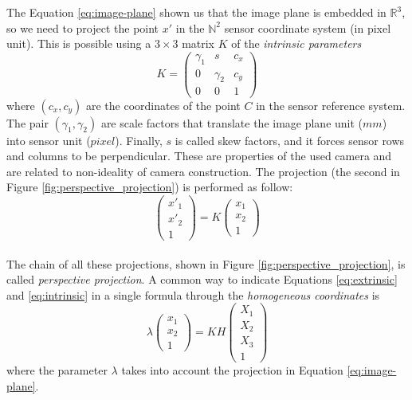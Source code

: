 The Equation \ref{eq:image-plane} shown us that the image plane is embedded in $\mathds{R}^3$, so we need to project the point $x'$ in the $\mathds{N}^2$ sensor coordinate system (in pixel unit). This is possible using a $3 \times 3$ matrix $K$ of the \textit{intrinsic parameters}
  \begin{equation*}
    \label{eq:intrinsic_matrix}
    K =
    \begin{pmatrix}
      \gamma_1	& s			& c_x \\
      0			& \gamma_2	& c_y \\
      0			& 0				& 1
    \end{pmatrix}
  \end{equation*}
where $\left( c_x, c_y \right)$ are the coordinates of the point $C$ in the sensor reference system. The pair $\left( \gamma_1, \gamma_2 \right)$ are scale factors that translate the image plane unit ($mm$) into sensor unit ($pixel$). Finally, $s$ is called skew factors, and it forces sensor rows and columns to be perpendicular. These are properties of the used camera and are related to non-ideality of camera construction. The projection (the second in Figure \ref{fig:perspective_projection}) is performed as follow:
  \begin{equation}
    \label{eq:intrinsic}
    \begin{pmatrix}
      x'_1 \\ x'_2 \\ 1
    \end{pmatrix}
    = K 
    \begin{pmatrix}
      x_1 \\ x_2 \\ 1
    \end{pmatrix}
  \end{equation} \\

The chain of all these projections, shown in Figure \ref{fig:perspective_projection}, is called \textit{perspective projection}. A common way to indicate Equations \ref{eq:extrinsic} and \ref{eq:intrinsic} in a single formula through the \textit{homogeneous coordinates} is
  \begin{equation}
    \label{eq:perspective_projection}
    \lambda
    \begin{pmatrix}
      x_1 \\ x_2 \\ 1
    \end{pmatrix}
    = KH
    \begin{pmatrix}
      X_1 \\ X_2 \\ X_3 \\ 1
    \end{pmatrix}
  \end{equation}
where the parameter $\lambda$ takes into account the projection in Equation \ref{eq:image-plane}.


